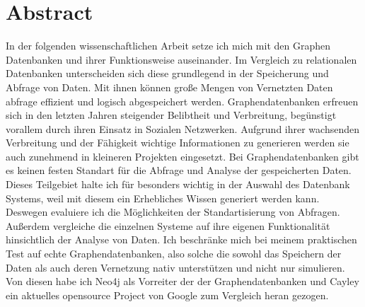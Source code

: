 \pagestyle{empty} %


\chapter*{Abstract} %
\label{cha:abtract}
	In der folgenden wissenschaftlichen Arbeit setze ich mich mit den Graphen Datenbanken und ihrer Funktionsweise auseinander.
	Im Vergleich zu relationalen Datenbanken unterscheiden sich diese grundlegend in der Speicherung und Abfrage von Daten. 
	Mit ihnen können große Mengen von Vernetzten Daten abfrage effizient und logisch abgespeichert werden.
	Graphendatenbanken erfreuen sich in den letzten Jahren steigender Belibtheit und Verbreitung, begünstigt vorallem durch ihren Einsatz in Sozialen Netzwerken.
	Aufgrund ihrer wachsenden Verbreitung und der Fähigkeit wichtige Informationen zu generieren werden sie auch zunehmend in kleineren Projekten eingesetzt.
	Bei Graphendatenbanken gibt es keinen festen Standart für die Abfrage und Analyse der gespeicherten Daten.
	Dieses Teilgebiet halte ich für besonders wichtig in der Auswahl des Datenbank Systems, weil mit diesem ein Erhebliches Wissen generiert werden kann. 
Deswegen evaluiere ich die Möglichkeiten der Standartisierung von Abfragen.
Außerdem vergleiche die einzelnen Systeme auf ihre eigenen Funktionalität hinsichtlich der Analyse von Daten.
	Ich beschränke mich bei meinem praktischen Test auf echte Graphendatenbanken, also solche die sowohl das Speichern der Daten als auch deren Vernetzung nativ unterstützen und nicht nur simulieren.
	Von diesen habe ich Neo4j als Vorreiter der der Graphendatenbanken und Cayley ein aktuelles opensource Project von Google zum Vergleich heran gezogen.